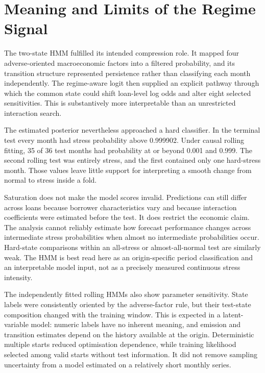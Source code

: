 \section{Meaning and Limits of the Regime Signal}

The two-state HMM fulfilled its intended compression role. It mapped four adverse-oriented macroeconomic factors into a filtered probability, and its transition structure represented persistence rather than classifying each month independently. The regime-aware logit then supplied an explicit pathway through which the common state could shift loan-level log odds and alter eight selected sensitivities. This is substantively more interpretable than an unrestricted interaction search.

The estimated posterior nevertheless approached a hard classifier. In the terminal test every month had stress probability above 0.999902. Under causal rolling fitting, 35 of 36 test months had probability at or beyond 0.001 and 0.999. The second rolling test was entirely stress, and the first contained only one hard-stress month. Those values leave little support for interpreting a smooth change from normal to stress inside a fold.

Saturation does not make the model scores invalid. Predictions can still differ across loans because borrower characteristics vary and because interaction coefficients were estimated before the test. It does restrict the economic claim. The analysis cannot reliably estimate how forecast performance changes across intermediate stress probabilities when almost no intermediate probabilities occur. Hard-state comparisons within an all-stress or almost-all-normal test are similarly weak. The HMM is best read here as an origin-specific period classification and an interpretable model input, not as a precisely measured continuous stress intensity.

The independently fitted rolling HMMs also show parameter sensitivity. State labels were consistently oriented by the adverse-factor rule, but their test-state composition changed with the training window. This is expected in a latent-variable model: numeric labels have no inherent meaning, and emission and transition estimates depend on the history available at the origin. Deterministic multiple starts reduced optimisation dependence, while training likelihood selected among valid starts without test information. It did not remove sampling uncertainty from a model estimated on a relatively short monthly series.

